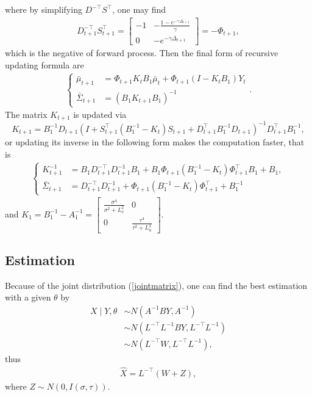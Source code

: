 where by simplifying $D^{-\top}S^\top$, one may find 
\begin{align*}
D_{t+1}^{-\top}S_{t+1}^\top = \begin{bmatrix}
-1 & -\frac{1-e^{-\gamma \Delta_{t+1}}}{\gamma} \\ 0 & - e^{-\gamma \Delta_{t+1}}
\end{bmatrix} = -\Phi_{t+1},
\end{align*}
which is the negative of forward process. Then the final form of recursive updating formula are 
\begin{align}
\begin{cases}
\bar{\mu}_{t+1}&=\Phi_{t+1} K_tB_1\bar{\mu}_t + \Phi_{t+1} (I-K_tB_1)Y_t\\
\bar{\Sigma}_{t+1}&=\left( B_1K_{t+1}B_1  \right)^{-1}
\end{cases}.
\end{align}
The matrix $K_{t+1}$ is updated via 
\begin{equation}
K_{t+1} =B_1^{-1}D_{t+1} (I+ S_{t+1}^\top (B_1^{-1} - K_t)  S_{t+1} +D_{t+1}^\top B_1^{-1}D_{t+1}  )^{-1}  D_{t+1}^\top B_1^{-1},
\end{equation}
or updating its inverse in the following form makes the computation faster, that is 
\begin{align*}
\begin{cases}
K_{t+1}^{-1} &= B_1D_{t+1}^{-\top}D_{t+1}^{-1}B_1 + B_1\Phi_{t+1} (B_1^{-1} - K_t) \Phi_{t+1}^\top B_1+ B_1,\\
\bar{\Sigma}_{t+1}&= D_{t+1}^{-\top}D_{t+1}^{-1}+ \Phi_{t+1} (B_1^{-1} - K_t) \Phi_{t+1}^\top + B_1^{-1}
\end{cases}
\end{align*}
and $K_1 =B_1^{-1} - A_1^{-1} = \begin{bmatrix}
\frac{\sigma^4}{\sigma^2 +L_x^2} & 0 \\ 0 &\frac{\tau^4}{\tau^2 +L_u^2}
\end{bmatrix} $.



\subsection*{Estimation}

Because of the joint distribution (\ref{jointmatrix}), one can find the best estimation with a given $\theta$ by
\begin{align*}
X \mid Y,\theta &\sim N \left( A^{-1}BY, A^{-1} \right) \\
&\sim N(L^{-\top}L^{-1}BY,L^{-\top}L^{-1})\\
&\sim N(L^{-\top}W,L^{-\top}L^{-1}),
\end{align*}
thus
\begin{align*}
\hat{X} = L^{-\top}(W+Z),
\end{align*}
where $Z \sim N(0, I(\sigma,\tau))$.


